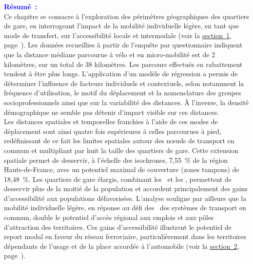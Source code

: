 \begin{refsegment}
    \newpage
    \begin{tcolorbox}[colback=white!5!white,
                      colframe=blue!75!blue,
                      title=
                      \bigskip
                      \center{\textbf{Préambule du chapitre~5}}
                      \\
                      \raggedright{\small{Chapitre composé de \pagedifference{chap5:titre}{part2:conclusion} pages, dont \pagedifference{chap5:bibliographie}{part2:conclusion} pages de bibliographie}}
                      \bigskip]
\Large{\textcolor{blue}{\textbf{Résumé~:}}}
    \\
    \small{
Ce chapitre se consacre à l'exploration des périmètres géographiques des quartiers de gare, en interrogeant l'impact de la mobilité individuelle légère, en tant que mode de transfert, sur l'accessibilité locale et intermodale (voir la \hyperref[chap5:aire-cyclable-micromobilite]{section~1}, page~\pageref{chap5:aire-cyclable-micromobilite}). Les données recueillies à partir de l'enquête par questionnaire indiquent que la distance médiane parcourue à vélo et en micro-mobilité est de 2 kilomètres, sur un total de 38 kilomètres. Les parcours effectués en rabattement tendent à être plus longs. L'application d'un modèle de régression a permis de déterminer l'influence de facteurs individuels et contextuels, selon notamment la fréquence d'utilisation, le motif du déplacement et la nomenclature des groupes socioprofessionnels ainsi que sur la variabilité des distances. À l'inverse, la densité démographique ne semble pas détenir d'impact visible sur ces distances.%
    \\
Les distances spatiales et temporelles franchies à l'aide de ces modes de déplacement sont ainsi quatre fois supérieures à celles parcourues à pied, redéfinissant de ce fait les limites spatiales autour des nœuds de transport en commun et multipliant par huit la taille des quartiers de gare. Cette extension spatiale permet de desservir, à l'échelle des isochrones, 7,55~\% de la région Hauts-de-France, avec un potentiel maximal de couverture (zones tampons) de 18,48~\%. Les quartiers de gare élargis, combinant les ~et les , permettent de desservir plus de la moitié de la population et accordent principalement des gains d'accessibilité aux populations défavorisées. L'analyse souligne par ailleurs que la mobilité individuelle légère, en réponse au défi des ~des systèmes de transport en commun, double le potentiel d'accès régional aux emplois et aux pôles d'attraction des territoires. Ces gains d'accessibilité illustrent le potentiel de report modal en faveur du réseau ferroviaire, particulièrement dans les territoires dépendants de l'usage et de la place accordée à l'automobile (voir la \hyperref[chap5:accessibilite-intermodale-extension-aire-influence]{section~2}, page~\pageref{chap5:accessibilite-intermodale-extension-aire-influence}).%
}
\end{tcolorbox}
\end{refsegment}
